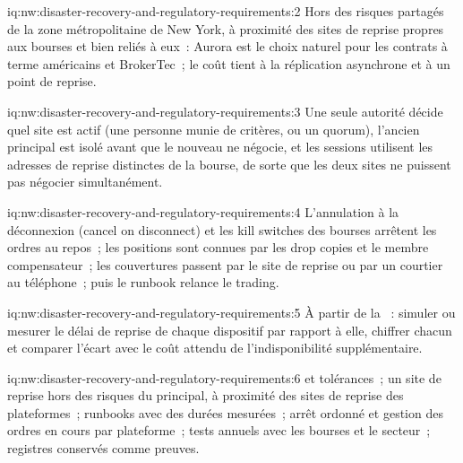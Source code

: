 \begin{solution}{iq:nw:disaster-recovery-and-regulatory-requirements:2}
Hors des risques partagés de la zone métropolitaine de New York, à proximité des sites de reprise propres aux bourses et bien reliés à eux~: Aurora
est le choix naturel pour les contrats à terme américains et BrokerTec~; le coût tient à la réplication asynchrone et à un point de reprise.
\end{solution}

\begin{solution}{iq:nw:disaster-recovery-and-regulatory-requirements:3}
Une seule autorité décide quel site est actif (une personne munie de critères, ou un quorum), l'ancien principal est isolé avant que le nouveau
ne négocie, et les sessions utilisent les adresses de reprise distinctes de la bourse, de sorte que les deux sites ne puissent pas négocier simultanément.
\end{solution}

\begin{solution}{iq:nw:disaster-recovery-and-regulatory-requirements:4}
L'annulation à la déconnexion (cancel on disconnect) et les kill switches des bourses arrêtent les ordres au repos~; les positions sont connues par les drop copies et le membre compensateur~;
les couvertures passent par le site de reprise ou par un courtier au téléphone~; puis le runbook relance le trading.
\end{solution}

\begin{solution}{iq:nw:disaster-recovery-and-regulatory-requirements:5}
À partir de la ~: simuler ou mesurer le délai de reprise de chaque dispositif par rapport à elle, chiffrer chacun et
comparer l'écart avec le coût attendu de l'indisponibilité supplémentaire.
\end{solution}

\begin{solution}{iq:nw:disaster-recovery-and-regulatory-requirements:6}
 et tolérances~; un site de reprise hors des risques du principal, à proximité des sites de reprise des plateformes~;
runbooks avec des durées mesurées~; arrêt ordonné et gestion des ordres en cours par plateforme~; tests annuels avec les bourses et le secteur~;
registres conservés comme preuves.
\end{solution}
